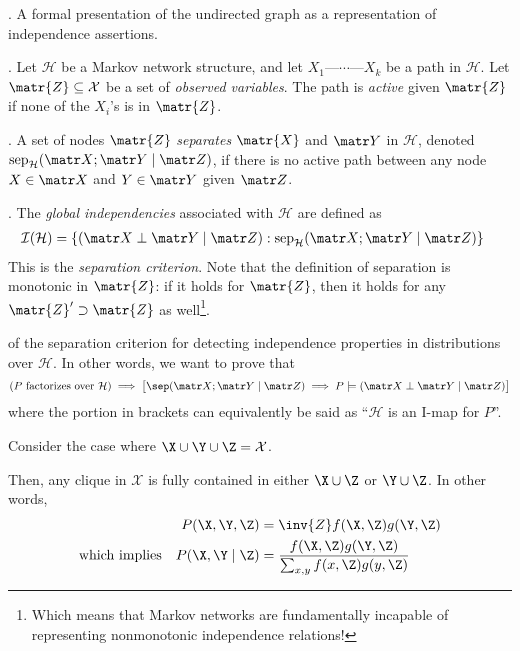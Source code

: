 \documentclass[11pt]{article}
\newcommand\myspace[1][]{\vspace{#1\bigskipamount}}
\newcommand\p{\Needspace{10\baselineskip} \noindent}
\begin{document}
\myspace
\p {}. A formal presentation of the undirected graph as a representation of independence assertions.
\begin{compactitem}
	\item {}. Let $\mathcal H$ be a Markov network structure, and let $X_1 \text{---} \cdots \text{---} X_k$ be a path in $\mathcal H$. Let $\matr{Z} \subseteq \mathcal{X}$ be a set of \textit{observed variables}. The path is \textit{active} given $\matr{Z}$ if none of the $X_i$'s is in $\matr{Z}$. 
	
	\item {}. A set of nodes $\matr{Z}$ \textit{separates} $\matr{X}$ and $\matr Y$ in $\mathcal H$, denoted $\text{sep}_{\mathcal H}(\matr X ; \matr Y \mid \matr Z)$, if there is no active path between any node $X \in \matr X$ and $Y \in \matr Y$ given $\matr  Z$. 
	
	\item {}. The \textit{global independencies} associated with $\mathcal H$ are defined as
	\begin{align}
		\mathcal{I}(\mathcal H) &= \{  (\matr X \perp \matr Y \mid \matr Z) : \text{sep}_{\mathcal H}(\matr X ; \matr Y \mid \matr Z)  \}
	\end{align}
	This is the \textit{separation criterion}. Note that the definition of separation is monotonic in $\matr{Z}$: if it holds for $\matr{Z}$, then it holds for any $\matr{Z}' \supset \matr{Z}$ as well\footnote{Which means that Markov networks are fundamentally incapable of representing nonmonotonic independence relations!}.
	
	\item {} of the separation criterion for detecting independence properties in distributions over $\mathcal{H}$. In other words, we want to prove that $$(P \text{ factorizes over }\mathcal{H}) \implies \big[\sep (\matr X ; \matr Y \mid \matr Z) \implies P \models (\matr X \perp \matr Y \mid \matr Z)\big]$$where the portion in brackets can equivalently be said as ``$\mathcal{H}$ is an I-map for $P$''. \\
	\begin{example}[Proof]
	\begin{compactitem}
		\item Consider the case where $\X \cup \Y \cup \Z = \mathcal{X}$. 
		
		\item Then, any clique in $\mathcal{X}$ is fully contained in either $\X \cup \Z$ or $\Y \cup \Z$. In other words,
		\begin{align}
			P(\X, \Y, \Z) &= \inv{Z} f(\X, \Z) g(\Y, \Z) \\
			\text{which implies}\quad
			P(\X, \Y \mid \Z) &= \dfrac{
				f(\X, \Z) g(\Y, \Z)
				}{
				\sum_{x, y} f(x, \Z) g(y, \Z)
				}
		\end{align}
		

\end{compactitem}
\end{example}
\end{compactitem}
\end{document}
